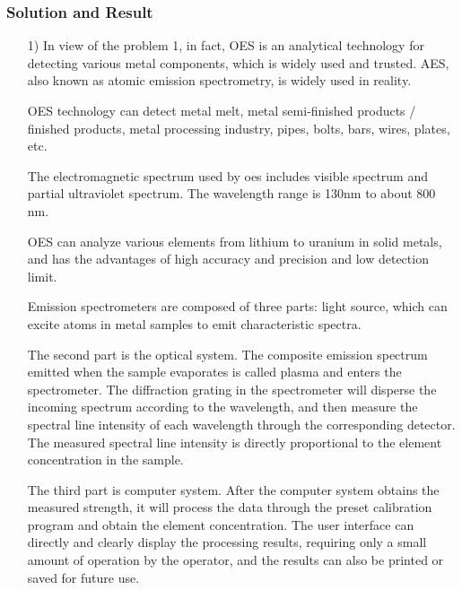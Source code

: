 \documentclass{apmcmthesis}
\begin{document}
\subsubsection{Solution and Result}
\begin{itemize}
\item [1)]In view of the problem 1, in fact, OES is an analytical technology for detecting various metal components, which is widely used and trusted. AES, also known as atomic emission spectrometry, is widely used in reality.\par

\qquad OES technology can detect metal melt, metal semi-finished products / finished products, metal processing industry, pipes, bolts, bars, wires, plates, etc.\par

\qquad The electromagnetic spectrum used by oes includes visible spectrum and partial ultraviolet spectrum. The wavelength range is 130nm to about 800 nm.\par

\qquad OES can analyze various elements from lithium to uranium in solid metals, and has the advantages of high accuracy and precision and low detection limit.\par

\qquad Emission spectrometers are composed of three parts: light source, which can excite atoms in metal samples to emit characteristic spectra.\par

\qquad The second part is the optical system. The composite emission spectrum emitted when the sample evaporates is called plasma and enters the spectrometer. The diffraction grating in the spectrometer will disperse the incoming spectrum according to the wavelength, and then measure the spectral line intensity of each wavelength through the corresponding detector. The measured spectral line intensity is directly proportional to the element concentration in the sample.\par

\qquad The third part is computer system. After the computer system obtains the measured strength, it will process the data through the preset calibration program and obtain the element concentration. The user interface can directly and clearly display the processing results, requiring only a small amount of operation by the operator, and the results can also be printed or saved for future use.\par


\end{itemize}
\end{document}
